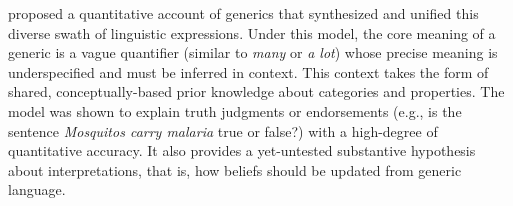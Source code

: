 \documentclass[floatsintext,doc]{apa6}
\begin{document}
 proposed a quantitative account of generics that synthesized and unified this diverse swath of linguistic expressions. 
Under this model, the core meaning of a generic is a vague quantifier (similar to \emph{many} or \emph{a lot}) whose precise meaning is underspecified and must be inferred in context. This context takes the form of shared, conceptually-based prior knowledge about categories and properties. 
The model was shown to explain truth judgments or endorsements (e.g., is the sentence \emph{Mosquitos carry malaria} true or false?) with a high-degree of quantitative accuracy. It also provides a yet-untested substantive hypothesis about interpretations, that is, how beliefs should be updated from generic language. 




\end{document}
